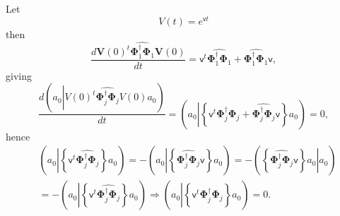 \documentclass[aps,preprint]{revtex4}%
\begin{document}
Let
\begin{equation}
V\left(  t\right)  =e^{\mathsf{v}t}%
\end{equation}
then
\begin{equation}
\frac{d\mathbf{V}\left(  0\right)  ^{t}\widehat{\mathbf{\Phi}_{1}^{\dagger
}\mathbf{\Phi}_{1}}\mathbf{V}\left(  0\right)  }{dt}=\mathsf{v}^{t}%
\widehat{\mathbf{\Phi}_{1}^{\dagger}\mathbf{\Phi}_{1}}+\widehat{\mathbf{\Phi
}_{1}^{\dagger}\mathbf{\Phi}_{1}}\mathsf{v,}%
\end{equation}
giving
\begin{equation}
\frac{d\left(  a_{0}\left\vert V\left(  0\right)  ^{t}\widehat{\mathbf{\Phi
}_{j}^{\dagger}\mathbf{\Phi}_{j}}V\left(  0\right)  a_{0}\right.  \right)
}{dt}=\left(  a_{0}\left\vert \left\{  \mathsf{v}^{t}\mathbf{\Phi}%
_{j}^{\dagger}\mathbf{\Phi}_{j}+\widehat{\mathbf{\Phi}_{j}^{\dagger
}\mathbf{\Phi}_{j}}\mathsf{v}\right\}  a_{0}\right.  \right)  =0,
\end{equation}
hence
\begin{align}
&  \left(  a_{0}\left\vert \left\{  \mathsf{v}^{t}\widehat{\mathbf{\Phi}%
_{j}^{\dagger}\mathbf{\Phi}_{j}}\right\}  a_{0}\right.  \right)  =-\left(
a_{0}\left\vert \left\{  \widehat{\mathbf{\Phi}_{j}^{\dagger}\mathbf{\Phi}%
_{j}}\mathsf{v}\right\}  a_{0}\right.  \right)  =-\left(  \left.  \left\{
\widehat{\mathbf{\Phi}_{j}^{\dagger}\mathbf{\Phi}_{j}}\mathsf{v}\right\}
a_{0}\right\vert a_{0}\right) \\
&  =-\left(  a_{0}\left\vert \left\{  \mathsf{v}^{t}\widehat{\mathbf{\Phi}%
_{j}^{\dagger}\mathbf{\Phi}_{j}}\right\}  a_{0}\right.  \right)
\Rightarrow\left(  a_{0}\left\vert \left\{  \mathsf{v}^{t}\widehat
{\mathbf{\Phi}_{j}^{\dagger}\mathbf{\Phi}_{j}}\right\}  a_{0}\right.  \right)
=0.
\end{align}
\end{document}

